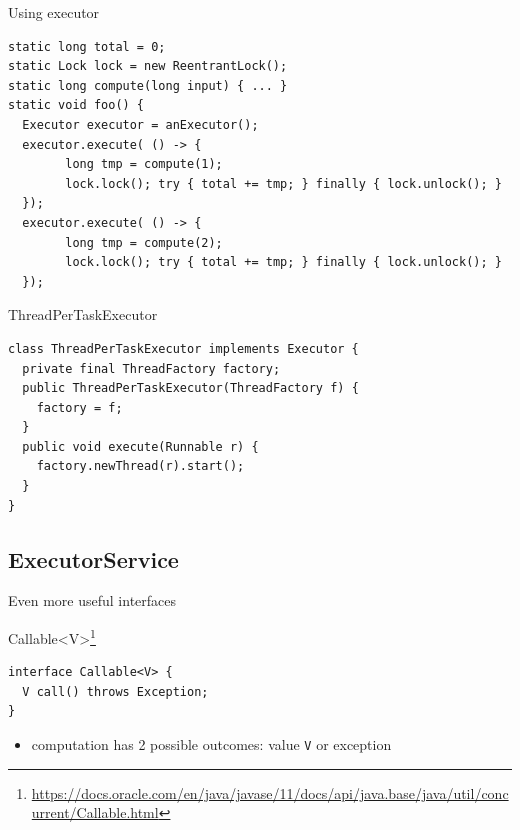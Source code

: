 \begin{frame}[t,fragile]{Using executor}

\begin{verbatim}
static long total = 0;
static Lock lock = new ReentrantLock();
static long compute(long input) { ... }
static void foo() {
  Executor executor = anExecutor();
  executor.execute( () -> {
        long tmp = compute(1);
        lock.lock(); try { total += tmp; } finally { lock.unlock(); }
  });
  executor.execute( () -> {
        long tmp = compute(2);
        lock.lock(); try { total += tmp; } finally { lock.unlock(); }
  });
\end{verbatim}
\end{frame}

\begin{frame}[fragile]{ThreadPerTaskExecutor}

\begin{verbatim}
class ThreadPerTaskExecutor implements Executor {
  private final ThreadFactory factory;
  public ThreadPerTaskExecutor(ThreadFactory f) {
    factory = f;
  }
  public void execute(Runnable r) {
    factory.newThread(r).start();
  }
}
\end{verbatim}
\end{frame}


\subsection{ExecutorService}
\showTOCSub

\begin{frame}[t,fragile]{Even more useful interfaces}

Callable<V>\footnote{\tiny\url{https://docs.oracle.com/en/java/javase/11/docs/api/java.base/java/util/concurrent/Callable.html}}
\begin{verbatim}
interface Callable<V> {
  V call() throws Exception;
}
\end{verbatim}

\begin{itemize}
    \item computation has 2 possible outcomes: value \texttt{V} or exception
\end{itemize}
\end{frame}


